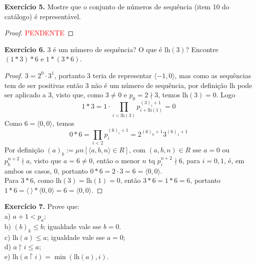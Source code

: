 \documentclass[11pt]{article}
\begin{document}
\begin{shaded}
\textbf{Exercício 5.} Mostre que o conjunto de números de sequência (item 10 do catálogo) é representável.
\end{shaded}

\begin{proof}
    
    \textcolor{red}{PENDENTE}
\end{proof}

\begin{shaded}
\textbf{Exercício 6.} $3$ é um número de sequência? O que é $\text{lh}(3)$? Encontre $(1*3)*6$ e $1*(3*6)$.
\end{shaded}

\begin{proof}
    $3=2^0\cdot3^1$, portanto $3$ teria de representar $\langle-1,0\rangle$, mas como as sequências tem de ser positivas então $3$ não é um número de sequência, por definição $\text{lh}$ pode ser aplicado a $3$, visto que, como $3\neq0$ e $p_0=2\nmid3$, temos $\text{lh}(3)=0$. Logo
    $$1*3=1\cdot\prod_{i<\text{lh}(3)}p_{i+\text{lh}(1)}^{(3)_i+1}=0$$
    Como $6=\langle0,0\rangle$, temos
    $$0*6=\prod_{i<2}p_i^{(6)_i+1}=2^{(6)_0+1}3^{(6)_1+1}$$
    Por definição $(a)_b:=\mu n[\langle a,b,n\rangle\in R]$, com $(a,b,n)\in R$ sse $a=0$ ou $p_b^{n+2}\nmid a$, visto que $a=6\neq0$, então o menor $n$ tq $p_i^{n+2}\nmid 6$, para $i=0,1$, é, em ambos os casos, $0$, portanto $0*6=2\cdot3=6=\langle0,0\rangle$.\\
    Para $3*6$, como $\text{lh}(3)=\text{lh}(1)=0$, então $3*6=1*6=6$, portanto $1*6=\langle~\rangle*\langle0,0\rangle=6=\langle0,0\rangle$.
\end{proof}

\begin{shaded}
\textbf{Exercício 7.} Prove que:\\
a) $a+1<p_a$;\\
b) $(b)_k\leq b$; igualdade vale sse $b=0$.\\
c) $\text{lh}(a)\leq a$; igualdade vale sse $a=0$;\\
d) $a\upharpoonright i\leq a$;\\
e) $\text{lh}(a\upharpoonright i)=\min(\text{lh}(a),i)$.
\end{shaded}
\end{document}
